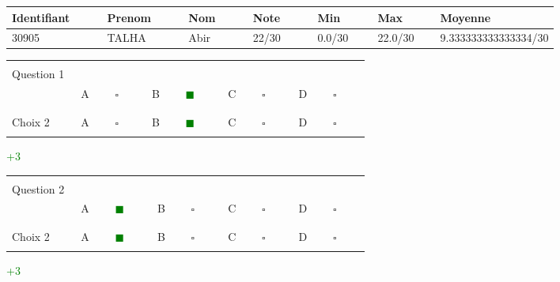 \documentclass{book}%
\begin{document}
%
\normalsize%
\newpage%
\thispagestyle{empty}%
\begin{tabular}{|l|l|l|l|l|l|l| }%
\hline%
Identifiant $\qquad$ & Prenom $\qquad$ & Nom $\qquad$ & Note $\qquad$ & Min $\qquad$ & Max $\qquad$ & Moyenne $\qquad$ \\%
\hline%
30905&TALHA&Abir&22/30&0.0/30 &22.0/30 & 9.333333333333334/30\\%
\hline%
\end{tabular}%
\thispagestyle{empty}%
\begin{center}%
\begin{tabular}{| l  l  l  l  l |}%
\hline%
 & & & & \\%
Question 1\qquad \qquad\ & & & & \\%
& A $\qquad \square \qquad$& B \textcolor{green}{$\qquad \blacksquare \qquad$}& C $\qquad \square \qquad$& D $\qquad \square \qquad$\\%
 & & & & \\%
\hline%
 & & & &  \\%
Choix 2& A $\qquad \square \qquad$& B \textcolor{green}{$\qquad \blacksquare \qquad$}& C $\qquad \square \qquad$& D $\qquad \square \qquad$\\%
 & & & &  \\%
\hline%
\end{tabular}%
 \qquad  \textcolor{green}{+3}%
\\ \vskip3mm%
\end{center}%
\thispagestyle{empty}%
\begin{center}%
\begin{tabular}{| l  l  l  l  l |}%
\hline%
 & & & & \\%
Question 2\qquad \qquad\ & & & & \\%
& A \textcolor{green}{$\qquad \blacksquare \qquad$}& B $\qquad \square \qquad$& C $\qquad \square \qquad$& D $\qquad \square \qquad$\\%
 & & & & \\%
\hline%
 & & & &  \\%
Choix 2& A \textcolor{green}{$\qquad \blacksquare \qquad$}& B $\qquad \square \qquad$& C $\qquad \square \qquad$& D $\qquad \square \qquad$\\%
 & & & &  \\%
\hline%
\end{tabular}%
 \qquad  \textcolor{green}{+3}%
\\ \vskip3mm%
\end{center}%
\thispagestyle{empty}%
\end{document}
